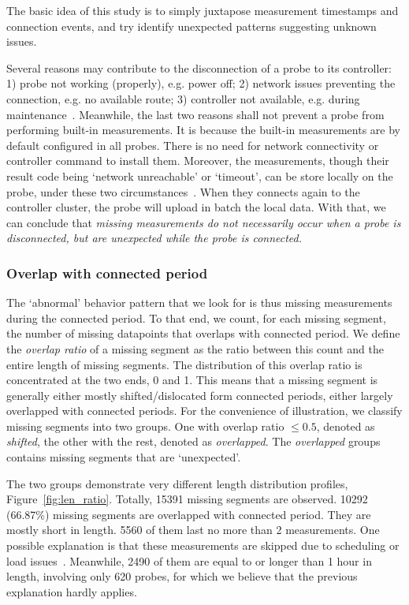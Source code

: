 The basic idea of this study is to simply juxtapose measurement timestamps and connection events, and try identify unexpected patterns suggesting unknown issues.

Several reasons may contribute to the disconnection of a probe to its controller: 1) probe not working (properly), e.g. power off; 2) network issues preventing the connection, e.g. no available route; 3) controller not available, e.g. during maintenance~\cite{controller}. 
Meanwhile, the last two reasons shall not prevent a probe from performing built-in measurements.
It is because the built-in measurements are by default configured in all probes.
There is no need for network connectivity or controller command to install them.
Moreover, the measurements, though their result code being `network unreachable' or `timeout', can be store locally on the probe, under these two circumstances~\cite{usb}.
When they connects again to the controller cluster, the probe will upload in batch the local data.
With that, we can conclude that \textit{missing measurements do not necessarily occur when a probe is disconnected, but are unexpected while the probe is connected.}

\subsubsection{Overlap with connected period}
The `abnormal' behavior pattern that we look for is thus missing measurements during the connected period.
To that end, we count, for each missing segment, the number of missing datapoints that overlaps with connected period.
We define the \textit{overlap ratio} of a missing segment as the ratio between this count and the entire length of missing segments. 
The distribution of this overlap ratio is concentrated at the two ends, 0 and 1. 
This means that a missing segment is generally either mostly shifted/dislocated form connected periods, either largely overlapped with connected periods.
For the convenience of illustration, we classify missing segments into two groups.
One with overlap ratio $\leq0.5$, denoted as \textit{shifted}, the other with the rest, denoted as \textit{overlapped}.
The \textit{overlapped} groups contains missing segments that are `unexpected'.

The two groups demonstrate very different length distribution profiles, Figure~\ref{fig:len_ratio}.
Totally, 15391 missing segments are observed. 
10292 (66.87\%) missing segments are overlapped with connected period. 
They are mostly short in length. 5560 of them last no more than 2 measurements. 
One possible explanation is that these measurements are skipped due to scheduling or load issues~\cite{schedule, Holterbach2015a}.
Meanwhile, 2490 of them are equal to or longer than 1 hour in length, involving only 620 probes, for which we believe that the previous explanation hardly applies.

